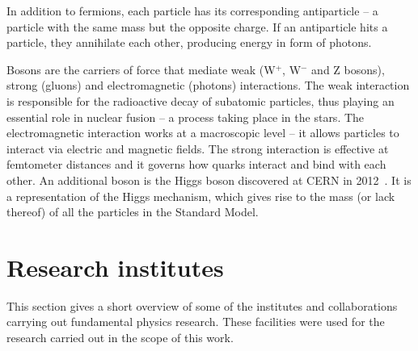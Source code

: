 \begin{description}
In addition to fermions, each particle has its corresponding antiparticle -- a particle with the same mass but the opposite charge. If an antiparticle hits a particle, they annihilate each other, producing energy in form of photons. 

Bosons are the carriers of force that mediate weak (W$^+$, W$^-$ and Z bosons), strong (gluons) and electromagnetic (photons) interactions. The weak interaction is responsible for the radioactive decay of subatomic particles, thus playing an essential role in nuclear fusion -- a process taking place in the stars. The electromagnetic interaction works at a macroscopic level -- it allows particles to interact via electric and magnetic fields. The strong interaction is effective at femtometer distances and it governs how quarks interact and bind with each other. An additional boson is the Higgs boson discovered at CERN in 2012~\cite{Rossi:2026222}. It is a representation of the Higgs mechanism, which gives rise to the mass (or lack thereof) of all the particles in the Standard Model.
\end{description}

\section{Research institutes}
This section gives a short overview of some of the institutes and collaborations carrying out fundamental physics research. These facilities were used for the research carried out in the scope of this work. 


